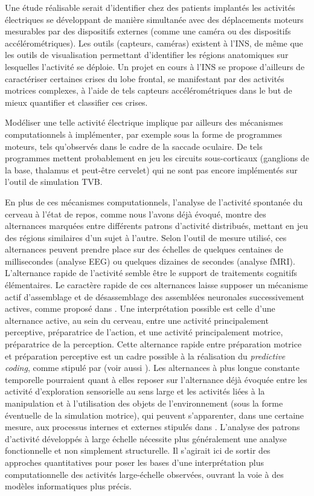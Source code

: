 \documentclass[11pt]{article}
\begin{document}
Une étude réalisable serait d'identifier chez des patients implantés  
les activités électriques se développant 
de manière simultanée avec des déplacements moteurs mesurables par des dispositifs externes (comme une caméra
ou des dispositifs accélérométriques).
Les outils (capteurs, caméras) existent à l'INS, de même que les outils de visualisation
permettant d'identifier les
régions anatomiques sur lesquelles l'activité se déploie.
Un projet en cours à l'INS se propose d'ailleurs de caractériser certaines crises 
du lobe frontal, se manifestant par des activités motrices complexes, à l'aide de 
tels capteurs accélérométriques dans le but de mieux quantifier et classifier ces crises.


Modéliser une telle activité électrique implique par ailleurs
des mécanismes computationnels à implémenter, par exemple sous
la forme de programmes moteurs, tels qu'observés
dans le cadre de la saccade oculaire. 
De tels programmes mettent probablement
en jeu les circuits sous-corticaux (ganglions de la base, thalamus et peut-être cervelet) 
qui ne sont pas encore
implémentés sur l'outil de simulation TVB.

En plus de ces mécanismes computationnels, l'analyse de l'activité
spontanée du cerveau à l'état de repos, comme nous l'avons déjà évoqué, montre
des alternances marquées entre différents patrons d'activité distribués, mettant en jeu des
régions similaires d'un sujet à l'autre. Selon l'outil de mesure
utilisé, ces alternances peuvent prendre place sur des échelles de quelques centaines de 
millisecondes  (analyse EEG) ou quelques dizaines de secondes  (analyse fMRI).
L'alternance rapide de l'activité semble être le support de  traitements cognitifs
élémentaires. Le caractère rapide de ces alternances laisse supposer un mécanisme actif d'assemblage
et de désassemblage des assemblées neuronales successivement actives, comme proposé dans . 
Une interprétation possible est celle d'une alternance active, au sein du cerveau, entre une activité 
principalement perceptive, préparatrice de l'action, et une activité principalement motrice, préparatrice
de la perception. Cette alternance rapide entre préparation motrice et préparation 
perceptive est un cadre possible à la réalisation du \textit{predictive coding}, comme stipulé par 
 (voir aussi ). Les alternances à plus longue constante
temporelle pourraient quant à elles reposer sur l'alternance déjà évoquée entre les activité d'exploration
sensorielle au sens large et les activités liées à la manipulation et à l'utilisation des objets
de l'environnement (sous la forme éventuelle de la simulation motrice), qui peuvent s'apparenter, dans
une certaine mesure, aux processus internes et externes stipulés dans .
L'analyse des patrons d'activité développés à large échelle nécessite plus généralement une analyse
fonctionnelle et non simplement structurelle. Il s'agirait ici de sortir des approches quantitatives
pour poser les bases d'une interprétation plus computationnelle 
des activités large-échelle observées, ouvrant la voie à
des modèles informatiques plus précis.
\end{document}
